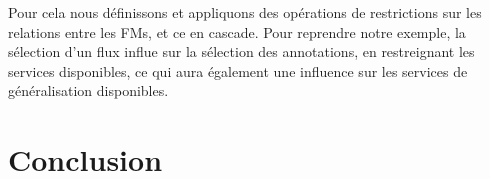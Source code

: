 \documentclass[]{easychair}
\newcommand{\comment}[4]{\par\noindent\hspace*{-0.5cm}{\parbox{\columnwidth}{\textbf{\color{#1}//#2[#3]:#4}}}\par}
\newcommand{\ch}[1]{\comment{green}{}{#1}{CH}}
\begin{document}
Pour cela nous définissons et appliquons des opérations de restrictions sur les relations entre les FMs, et ce en cascade. Pour reprendre notre exemple, la sélection d'un flux influe sur la sélection des annotations, en restreignant les services disponibles, ce qui aura également une influence sur les services de généralisation disponibles. 

%
%
%


\section{Conclusion}
\label{sect:conclusion}



%
\label{sect:bib}

%
%
%


\appendix


\end{document}

